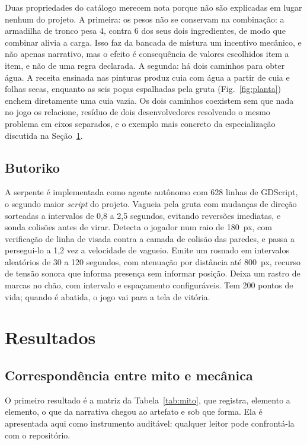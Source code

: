 \documentclass[conference]{IEEEtran}
\begin{document}
Duas propriedades do catálogo merecem nota porque não são explicadas em lugar nenhum do
projeto. A primeira: os pesos não se conservam na combinação: a armadilha de tronco pesa
4, contra 6 dos seus dois ingredientes, de modo que combinar alivia a carga. Isso faz da
bancada de mistura um incentivo mecânico, e não apenas narrativo, mas o efeito é
consequência de valores escolhidos item a item, e não de uma regra declarada. A segunda:
há dois caminhos para obter água. A receita ensinada nas pinturas produz cuia com água a
partir de cuia e folhas secas, enquanto as seis poças espalhadas pela gruta
(Fig.~\ref{fig:planta}) enchem diretamente uma cuia vazia. Os dois caminhos coexistem
sem que nada no jogo os relacione, resíduo de dois desenvolvedores resolvendo o mesmo
problema em eixos separados, e o exemplo mais concreto da especialização discutida na
Seção~\ref{sec:resultados}.

\subsection{Butoriko}

A serpente é implementada como agente autônomo com 628 linhas de GDScript, o segundo
maior \textit{script} do projeto. Vagueia pela gruta com mudanças de direção sorteadas a
intervalos de 0{,}8 a 2{,}5 segundos, evitando reversões imediatas, e sonda colisões
antes de virar. Detecta o jogador num raio de 180~px, com verificação de linha de visada
contra a camada de colisão das paredes, e passa a persegui-lo a 1{,}2 vez a velocidade
de vagueio. Emite um rosnado em intervalos aleatórios de 30 a 120 segundos, com
atenuação por distância até 800~px, recurso de tensão sonora que informa presença sem
informar posição. Deixa um rastro de marcas no chão, com intervalo e espaçamento
configuráveis. Tem 200 pontos de vida; quando é abatida, o jogo vai para a tela de
vitória.

\section{Resultados}
\label{sec:resultados}

\subsection{Correspondência entre mito e mecânica}

O primeiro resultado é a matriz da Tabela~\ref{tab:mito}, que registra, elemento a
elemento, o que da narrativa chegou ao artefato e sob que forma. Ela é apresentada aqui
como instrumento auditável: qualquer leitor pode confrontá-la com o repositório.
\end{document}
